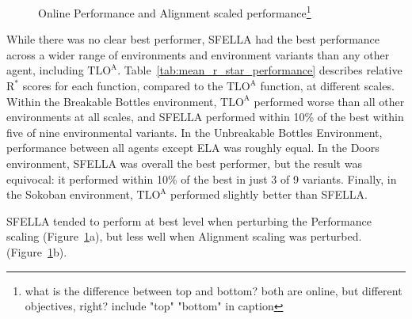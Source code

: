 \begin{figure}
  \caption{Online Performance and Alignment scaled performance\footnote{what is the difference between top and bottom? both are online, but different objectives, right? include "top" "bottom" in caption}}
   \label{fig:online_performance}
 \end{figure}

While there was no clear best performer, SFELLA had the best performance across a wider range of environments and environment variants than any other agent, including  $\text{TLO}^\text{A}$. Table~\ref{tab:mean_r_star_performance} describes relative $\text{R}^*$ scores for each function, compared to the $\text{TLO}^\text{A}$ function, at different scales.  Within the Breakable Bottles environment, $\text{TLO}^\text{A}$ performed worse than all other environments at all scales, and SFELLA performed within 10\% of the best within five of nine environmental variants. In the Unbreakable Bottles Environment, performance between all agents except ELA was roughly equal. In the Doors environment, SFELLA was overall the best performer, but the result was equivocal: it performed within 10\% of the best in just 3 of 9 variants. Finally, in the Sokoban environment, $\text{TLO}^\text{A}$ performed slightly better than SFELLA.

SFELLA tended to perform at best level when perturbing the Performance scaling (Figure~\ref{fig:online_performance}a), but less well when Alignment scaling was perturbed. (Figure~\ref{fig:online_performance}b).